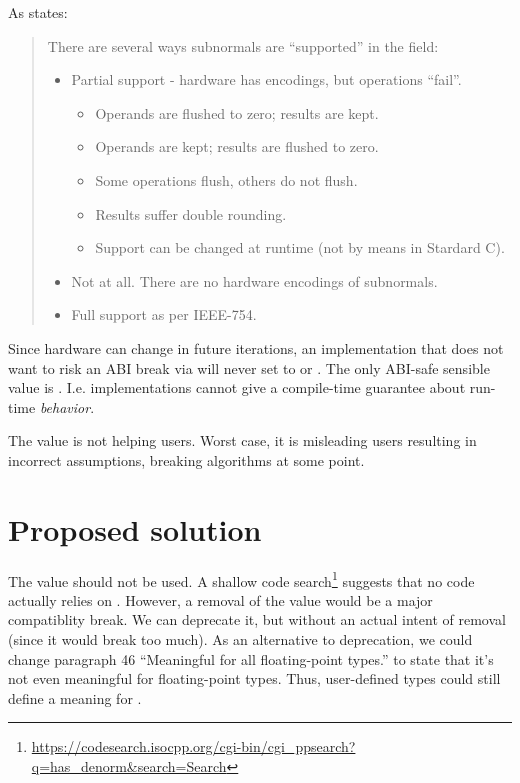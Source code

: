 As \textcite{WG14N2993} states:
\begin{quote}{}
There are several ways subnormals are “supported” in the field:

\begin{itemize}
  \item Partial support - hardware has encodings, but operations “fail”.
  \begin{itemize}
    \item Operands are flushed to zero; results are kept.
    \item Operands are kept; results are flushed to zero.
    \item Some operations flush, others do not flush.
    \item Results suffer double rounding.
    \item Support can be changed at runtime (not by means in Stardard C).
  \end{itemize}
  \item Not at all. There are no hardware encodings of subnormals.
  \item Full support as per IEEE-754.
\end{itemize}
\end{quote}

Since hardware can change in future iterations, an implementation that does not want to 
risk an ABI break via  will never set  to 
 or . The only ABI-safe sensible value is 
. I.e. implementations cannot give a compile-time guarantee 
about run-time \emph{behavior}.

The  value is not helping \CC{} users. Worst case, it is misleading users 
resulting in incorrect assumptions, breaking algorithms at some point.

\section{Proposed solution}

The  value should not be used. A shallow code 
search\footnote{\url{https://codesearch.isocpp.org/cgi-bin/cgi_ppsearch?q=has_denorm&search=Search}} 
suggests that no code actually relies on . However, a removal of the 
value would be a major compatiblity break. We can deprecate it, but without an actual 
intent of removal (since it would break too much). As an alternative to deprecation, we 
could change paragraph 46 “Meaningful for all floating-point types.” to state that it's 
not even meaningful for floating-point types. Thus, user-defined types could still define 
a meaning for .

